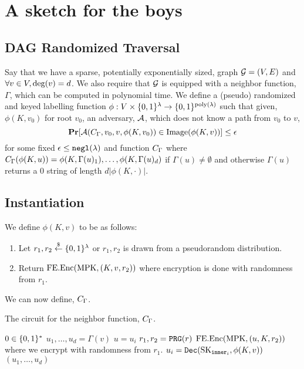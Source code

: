 \section{A sketch for the boys}
\newcommand{\labelFunc}{\phi}
\newcommand{\imageFn}{\text{Image}}

\subsection{DAG Randomized Traversal}
Say that we have a sparse, potentially exponentially sized, graph $\mathcal{G} = (V, E)$
and $\forall v \in V, \deg(v) = d$.
We also require that $\mathcal{G}$ is equipped with a neighbor function, $\Gamma$, which can be computed in polynomial time.
We define a (pseudo) randomized and keyed labelling function $\phi: V \times \{0,1\}^\lambda \rightarrow \{0,1\}^{\operatorname{poly}(\lambda)}$ 
such that given, $\phi(K, v_0)$ for root $v_0$, an adversary, $\mathcal{A}$, which does not know a path from $v_0$ to $v$,
\begin{equation}
	\label{eq:guessPhi}
	\Pr[\advers(\circNeigb, v_0, v, \labelFunc(K, v_0)) \in \imageFn(\labelFunc(K, v))] \leq \eps
\end{equation}
for some fixed $\epsilon \leq \texttt{negl}(\lambda)$ and function $C_\Gamma$ where $\circNeigb(\labelFunc(K, u)) = \labelFunc(K, \Gamma(u)_1), \dots, \labelFunc(K, \Gamma(u)_d)$
if $\Gamma(u) \neq \emptyset$ and otherwise $\Gamma(u)$ returns a $0$ string of length $d |\labelFunc(K, \cdot)|$.

\subsection{Instantiation}
We define $\labelFunc(K, v)$ to be as follows:
\begin{enumerate}
	\item Let $r_1, r_2 \overset{\$}{\gets} \{0,1\}^\lambda$ or $r_1, r_2$ is drawn from a pseudorandom distribution. %
	\item Return $\text{FE.Enc}(\text{MPK}, (K, v, r_2))$ where encryption is done with randomness from $r_1$.
\end{enumerate}

We can now define, $C_\Gamma$.
\begin{algorithm}[H]
	\caption{
		The circuit for the neighbor function, $C_\Gamma$.
	}
	\begin{algorithmic}[1]
				\State \Return $0 \in \{0,1\}^*$ %
			\EndIf
			\State $u_1, \dots, u_d = \Gamma(v)$
			\State $u = u_i$
			\State $r_1, r_2 = \texttt{PRG}(r)$
			\State \Return $\text{FE.Enc}(\text{MPK}, (u, K, r_2))$ where we encrypt with randomness from $r_1$.
		\EndFunction
				\State $u_i = \texttt{Dec}(\text{SK}_{\texttt{inner}_i}, \phi(K, v))$
			\EndFor
			\State \Return $(u_1, \dots, u_d)$
		\EndFunction
	\end{algorithmic}
	\label{alg:neighb}
\end{algorithm}

